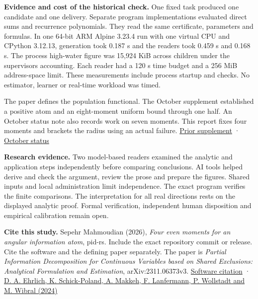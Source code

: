 \textbf{Evidence and cost of the historical check.} One fixed task produced one candidate and one delivery. Separate program implementations evaluated direct sums and recurrence polynomials. They read the same certificate, parameters and formulas. In one 64-bit ARM Alpine 3.23.4 run with one virtual CPU and CPython 3.12.13, generation took 0.187 s and the readers took 0.459 s and 0.168 s. The process high-water figure was 15,924 KiB across children under the supervisor\textquotesingle s accounting. Each reader had a 120 s time budget and a 256 MiB address-space limit. These measurements include process startup and checks. No estimator, learner or real-time workload was timed.

The paper defines the population functional. The October supplement established a positive atom and an eight-moment uniform bound through one half. An October status note also records work on seven moments. This report fixes four moments and brackets the radius using an actual failure. \href{https://github.com/sepahead/pid-rs/blob/main/audit/archive/angular-relative-bound-20261005/ARCHIVE.md}{Prior supplement} · \href{https://github.com/sepahead/pid-rs/blob/main/RESEARCH_RESULTS_2026_10_10.md}{October status}

\textbf{Research evidence.} Two model-based readers examined the analytic and application steps independently before comparing conclusions. AI tools helped derive and check the argument, review the prose and prepare the figures. Shared inputs and local administration limit independence. The exact program verifies the finite comparisons. The interpretation for all real directions rests on the displayed analytic proof. Formal verification, independent human disposition and empirical calibration remain open.

\textbf{Cite this study.} Sepehr Mahmoudian (2026), \emph{Four even moments for an angular information atom}, pid-rs. Include the exact repository commit or release. Cite the software and the defining paper separately. The paper is \emph{Partial Information Decomposition for Continuous Variables based on Shared Exclusions: Analytical Formulation and Estimation}, arXiv:2311.06373v3. \href{https://github.com/sepahead/pid-rs/blob/main/CITATION.cff}{Software citation} · \href{https://doi.org/10.1103/PhysRevE.110.014115}{D. A. Ehrlich, K. Schick-Poland, A. Makkeh, F. Lanfermann, P. Wollstadt and M. Wibral (2024)}
